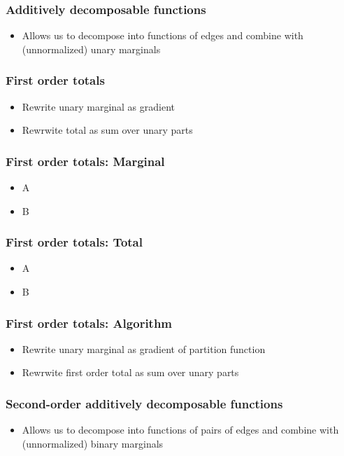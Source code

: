 \documentclass{beamer}
\begin{document}
\begin{frame}
\frametitle{Additively decomposable functions}
\begin{itemize}
\item Allows us to decompose into functions of edges and combine with (unnormalized)
    unary marginals
\end{itemize}
\end{frame}

\begin{frame}
\frametitle{First order totals}
\begin{itemize}
\item Rewrite unary marginal as gradient
\item Rewrwite total as sum over unary parts
\end{itemize}
\end{frame}

\begin{frame}
\frametitle{First order totals: Marginal}
\begin{itemize}
\item A
\item B
\end{itemize}
\end{frame}

\begin{frame}
\frametitle{First order totals: Total}
\begin{itemize}
\item A
\item B
\end{itemize}
\end{frame}

\begin{frame}
\frametitle{First order totals: Algorithm}
\begin{itemize}
\item Rewrite unary marginal as gradient of partition function
\item Rewrwite first order total as sum over unary parts
\end{itemize}
\end{frame}

\begin{frame}
\frametitle{Second-order additively decomposable functions}
\begin{itemize}
\item Allows us to decompose into functions of pairs of edges and combine with (unnormalized)
    binary marginals
\end{itemize}
\end{frame}
\end{document}
